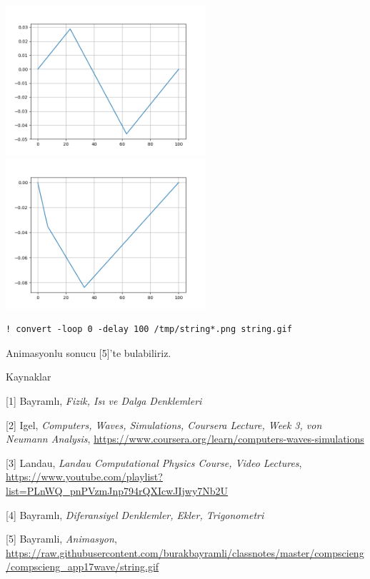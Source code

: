 \documentclass[12pt,fleqn]{article}\usepackage{../../common}
\begin{document}
\includegraphics[width=20em]{string-55.png}
\includegraphics[width=20em]{string-85.png}


\begin{verbatim}
! convert -loop 0 -delay 100 /tmp/string*.png string.gif
\end{verbatim}

Animasyonlu sonucu [5]'te bulabiliriz.

Kaynaklar

[1] Bayramlı, {\em Fizik, Isı ve Dalga Denklemleri}

[2] Igel, {\em Computers, Waves, Simulations, Coursera Lecture, Week 3, von Neumann Analysis},
    \url{https://www.coursera.org/learn/computers-waves-simulations}

[3] Landau, {\em Landau Computational Physics Course, Video Lectures},
    \url{https://www.youtube.com/playlist?list=PLnWQ_pnPVzmJnp794rQXIcwJIjwy7Nb2U}

[4] Bayramlı, {\em Diferansiyel Denklemler, Ekler, Trigonometri}

[5] Bayramli, {\em Animasyon},
    \url{https://raw.githubusercontent.com/burakbayramli/classnotes/master/compscieng/compscieng_app17wave/string.gif}
\end{document}
